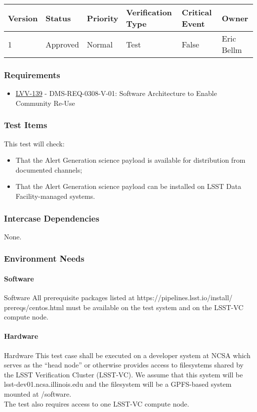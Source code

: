 \begin{longtable}[]{llllll}
\toprule
Version & Status & Priority & Verification Type & Critical Event & Owner
\\\midrule
1 & Approved & Normal &
Test & False & Eric Bellm
\\\bottomrule
\end{longtable}

\subsubsection{Requirements}
\begin{itemize}
\item \href{https://jira.lsstcorp.org/browse/LVV-139}{LVV-139} - DMS-REQ-0308-V-01: Software Architecture to Enable Community Re-Use
\end{itemize}

\subsubsection{Test Items}
This test will check:

\begin{itemize}
\tightlist
\item
  That the Alert Generation science payload is available for
  distribution from documented channels;
\item
  That the Alert Generation science payload can be installed on LSST
  Data Facility-managed systems.
\end{itemize}



\subsubsection{Intercase Dependencies}
None.


\subsubsection{Environment Needs}

\paragraph{Software}
Software All prerequisite packages listed at
https://pipelines.lsst.io/install/ prereqs/centos.html must be available
on the test system and on the LSST-VC compute node.


\paragraph{Hardware}
Hardware This test case shall be executed on a developer system at NCSA
which serves as the ``head node'' or otherwise provides access to
filesystems shared by the LSST Verification Cluster (LSST-VC). We assume
that this system will be lsst-dev01.ncsa.illinois.edu and the filesystem
will be a GPFS-based system mounted at /software.\\
The test also requires access to one LSST-VC compute node.


